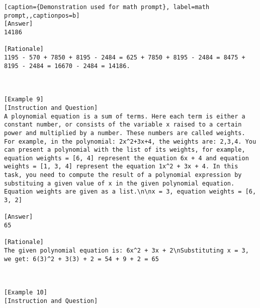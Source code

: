 \begin{lstlisting}[caption={Demonstration used for math prompt}, label=math prompt,,captionpos=b]
[Answer]
14186

[Rationale]
1195 - 570 + 7850 + 8195 - 2484 = 625 + 7850 + 8195 - 2484 = 8475 + 8195 - 2484 = 16670 - 2484 = 14186.



[Example 9]
[Instruction and Question]
A ploynomial equation is a sum of terms. Here each term is either a constant number, or consists of the variable x raised to a certain power and multiplied by a number. These numbers are called weights. For example, in the polynomial: 2x^2+3x+4, the weights are: 2,3,4. You can present a polynomial with the list of its weights, for example, equation weights = [6, 4] represent the equation 6x + 4 and equation weights = [1, 3, 4] represent the equation 1x^2 + 3x + 4. In this task, you need to compute the result of a polynomial expression by substituing a given value of x in the given polynomial equation. Equation weights are given as a list.\n\nx = 3, equation weights = [6, 3, 2]

[Answer]
65

[Rationale]
The given polynomial equation is: 6x^2 + 3x + 2\nSubstituting x = 3, we get: 6(3)^2 + 3(3) + 2 = 54 + 9 + 2 = 65



[Example 10]
[Instruction and Question]

    \end{lstlisting}
    




